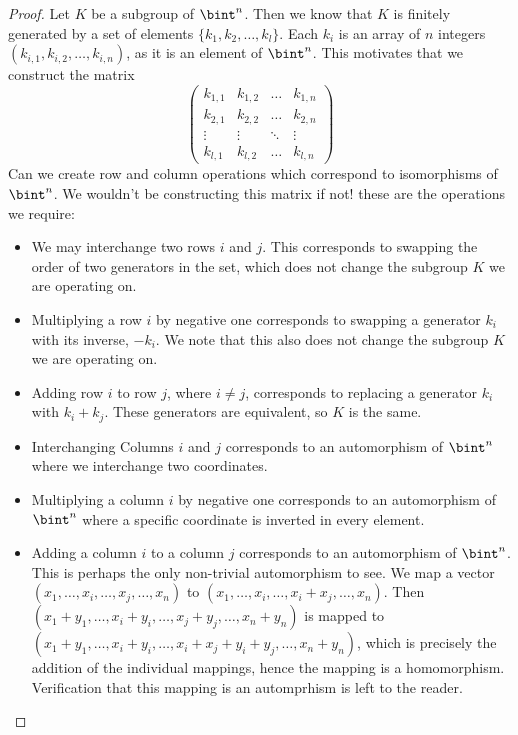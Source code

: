 \begin{proof}
    Let $K$ be a subgroup of $\bint^n$. Then we know that $K$ is finitely generated by a set of elements $\{ k_1, k_2, \dots, k_l \}$. Each $k_i$ is an array of $n$ integers $(k_{i,1}, k_{i,2}, \dots, k_{i,n})$, as it is an element of $\bint^n$. This motivates that we construct the matrix
    \[ \begin{pmatrix} k_{1,1} & k_{1,2} & \dots  & k_{1,n}\\
                       k_{2,1} & k_{2,2} & \dots  & k_{2,n}\\
                       \vdots  & \vdots  & \ddots & \vdots\\
                       k_{l,1} & k_{l,2} & \dots  & k_{l,n} \end{pmatrix} \]
    Can we create row and column operations which correspond to isomorphisms of $\bint^n$. We wouldn't be constructing this matrix if not! these are the operations we require:
    \begin{itemize}
        \item We may interchange two rows $i$ and $j$. This corresponds to swapping the order of two generators in the set, which does not change the subgroup $K$ we are operating on.
        \item Multiplying a row $i$ by negative one corresponds to swapping a generator $k_i$ with its inverse, $-k_i$. We note that this also does not change the subgroup $K$ we are operating on.
        \item Adding row $i$ to row $j$, where $i \neq j$, corresponds to replacing a generator $k_i$ with $k_i + k_j$. These generators are equivalent, so $K$ is the same.
        \item Interchanging Columns $i$ and $j$ corresponds to an automorphism of $\bint^n$ where we interchange two coordinates.
        \item Multiplying a column $i$ by negative one corresponds to an automorphism of $\bint^n$ where a specific coordinate is inverted in every element.
        \item Adding a column $i$ to a column $j$ corresponds to an automorphism of $\bint^n$. This is perhaps the only non-trivial automorphism to see. We map a vector $(x_1,\dots,x_i,\dots,x_j,\dots,x_n)$ to $(x_1,\dots,x_i, \dots, x_i + x_j, \dots, x_n)$. Then $(x_1 + y_1,\dots,x_i + y_i,\dots,x_j + y_j,\dots,x_n + y_n)$ is mapped to $(x_1 + y_1,\dots,x_i + y_i,\dots,x_i + x_j + y_i + y_j,\dots,x_n + y_n)$, which is precisely the addition of the individual mappings, hence the mapping is a homomorphism. Verification that this mapping is an automprhism is left to the reader.

\end{itemize}
\end{proof}

